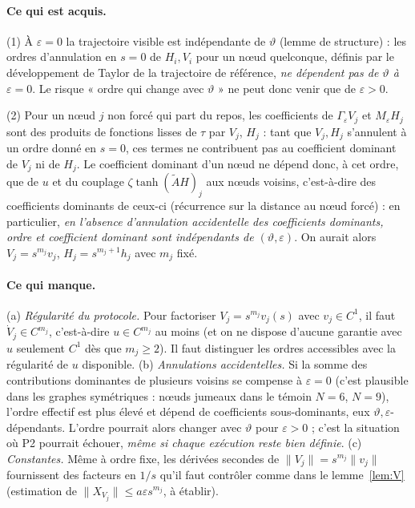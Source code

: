 \documentclass[11pt,a4paper]{article}
\theoremstyle{remark}
\theoremstyle{definition}
\newcommand{\norm}[1]{\lVert #1\rVert}
\newcommand{\eps}{\varepsilon}
\newcommand{\vth}{\vartheta}
\begin{document}
\paragraph{Ce qui est acquis.} (1) À $\eps=0$ la trajectoire visible est indépendante de $\vth$ (lemme de structure) : les ordres d'annulation en $s=0$ de $H_i,V_i$ pour un n\oe ud quelconque, définis par le développement de Taylor de la trajectoire de référence, \emph{ne dépendent pas de $\vth$ à $\eps=0$}. Le risque « ordre qui change avec $\vth$ » ne peut donc venir que de $\eps>0$.

(2) Pour un n\oe ud $j$ non forcé qui part du repos, les coefficients de $\Gamma_\eps V_j$ et $M_\eps H_j$ sont des produits de fonctions lisses de $\tau$ par $V_j$, $H_j$ : tant que $V_j,H_j$ s'annulent à un ordre donné en $s=0$, ces termes ne contribuent pas au coefficient dominant de $V_j$ ni de $H_j$. Le coefficient dominant d'un n\oe ud ne dépend donc, à cet ordre, que de $u$ et du couplage $\zeta\tanh(\tilde AH)_j$ aux n\oe uds voisins, c'est-à-dire des coefficients dominants de ceux-ci (récurrence sur la distance au n\oe ud forcé) : en particulier, \emph{en l'absence d'annulation accidentelle des coefficients dominants, ordre et coefficient dominant sont indépendants de $(\vth,\eps)$}. On aurait alors $V_j=s^{m_j}v_j$, $H_j=s^{m_j+1}h_j$ avec $m_j$ fixé.

\paragraph{Ce qui manque.} (a) \emph{Régularité du protocole.} Pour factoriser $V_j=s^{m_j}v_j(s)$ avec $v_j\in C^1$, il faut $\dot V_j\in C^{m_j}$, c'est-à-dire $u\in C^{m_j}$ au moins (et on ne dispose d'aucune garantie avec $u$ seulement $C^1$ dès que $m_j\ge2$). Il faut distinguer les ordres accessibles avec la régularité de $u$ disponible. (b) \emph{Annulations accidentelles.} Si la somme des contributions dominantes de plusieurs voisins se compense à $\eps=0$ (c'est plausible dans les graphes symétriques : n\oe uds jumeaux dans le témoin $N=6$, $N=9$), l'ordre effectif est plus élevé et dépend de coefficients sous-dominants, eux $\vth,\eps$-dépendants. L'ordre pourrait alors changer avec $\vth$ pour $\eps>0$ ; c'est la situation où P2 pourrait échouer, \emph{même si chaque exécution reste bien définie}. (c) \emph{Constantes.} Même à ordre fixe, les dérivées secondes de $\norm{V_j}=s^{m_j}\norm{v_j}$ fournissent des facteurs en $1/s$ qu'il faut contrôler comme dans le lemme~\ref{lem:V} (estimation de $\norm{X_{V_j}}\le a\eps s^{m_j}$, à établir).
\end{document}
